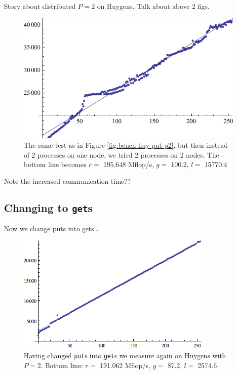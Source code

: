 \documentclass[a4paper]{article}
\begin{document}
Story about distributed $P=2$ on Huygens. Talk about above 2 figs. 

\begin{figure}[h]
    \begin{center}
        \includegraphics{img/bench-huy-put-p2-dist}
    \end{center}
    \caption{The same test as in Figure \ref{fig:bench-huy-put-p2}, but then
    instead of 2 processes on one node, we tried 2 processes on 2 nodes. The
    bottom line becomes $r=$ 195.648 Mflop/s, $g=$ 100.2, $l=$ 15770.4}
    \label{fig:bench-huy-put-p2-dist}
\end{figure}

Note the increased communication time??

\subsection{Changing to \texttt{get}s}
Now we change puts into gets\ldots

\begin{figure}[h]
    \begin{center}
        \includegraphics{img/bench-huy-get-p2.png}
    \end{center}
    \caption{Having changed \texttt{put}s into \texttt{get}s we measure again on
    Huygens with $P=2$. Bottom line: $r=$ 191.062 Mflop/s, $g=$ 87.2, $l=$ 2574.6}
    \label{fig:bench-huy-get-p2}
\end{figure}
\end{document}
